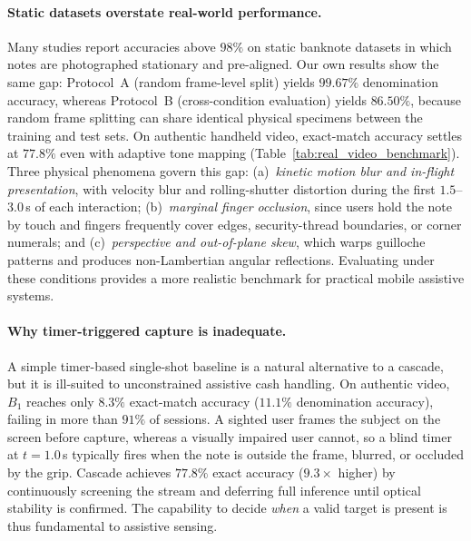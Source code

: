 \documentclass[final,5p,times,twocolumn,authoryear]{elsarticle}
\begin{document}
\paragraph{Static datasets overstate real-world performance.}
Many studies report accuracies above $98\%$ on static banknote datasets in which notes are photographed stationary and pre-aligned. Our own results show the same gap: Protocol~A (random frame-level split) yields $99.67\%$ denomination accuracy, whereas Protocol~B (cross-condition evaluation) yields $86.50\%$, because random frame splitting can share identical physical specimens between the training and test sets. On authentic handheld video, exact-match accuracy settles at $77.8\%$ even with adaptive tone mapping (Table~\ref{tab:real_video_benchmark}). Three physical phenomena govern this gap: (a)~\textit{kinetic motion blur and in-flight presentation}, with velocity blur and rolling-shutter distortion during the first $1.5$--$3.0$\,s of each interaction; (b)~\textit{marginal finger occlusion}, since users hold the note by touch and fingers frequently cover edges, security-thread boundaries, or corner numerals; and (c)~\textit{perspective and out-of-plane skew}, which warps guilloche patterns and produces non-Lambertian angular reflections. Evaluating under these conditions provides a more realistic benchmark for practical mobile assistive systems.

\paragraph{Why timer-triggered capture is inadequate.}
A simple timer-based single-shot baseline is a natural alternative to a cascade, but it is ill-suited to unconstrained assistive cash handling. On authentic video, $B_1$ reaches only $8.3\%$ exact-match accuracy ($11.1\%$ denomination accuracy), failing in more than $91\%$ of sessions. A sighted user frames the subject on the screen before capture, whereas a visually impaired user cannot, so a blind timer at $t = 1.0$\,s typically fires when the note is outside the frame, blurred, or occluded by the grip. Cascade achieves $77.8\%$ exact accuracy ($9.3\times$ higher) by continuously screening the stream and deferring full inference until optical stability is confirmed. The capability to decide \textit{when} a valid target is present is thus fundamental to assistive sensing.
\end{document}
